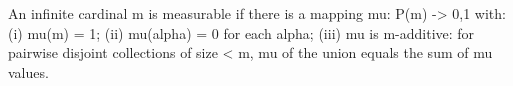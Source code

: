 An infinite cardinal m is measurable if there is a mapping mu: P(m) -> {0,1} with: (i) mu(m) = 1; (ii) mu({alpha}) = 0 for each alpha; (iii) mu is m-additive: for pairwise disjoint collections of size < m, mu of the union equals the sum of mu values.
